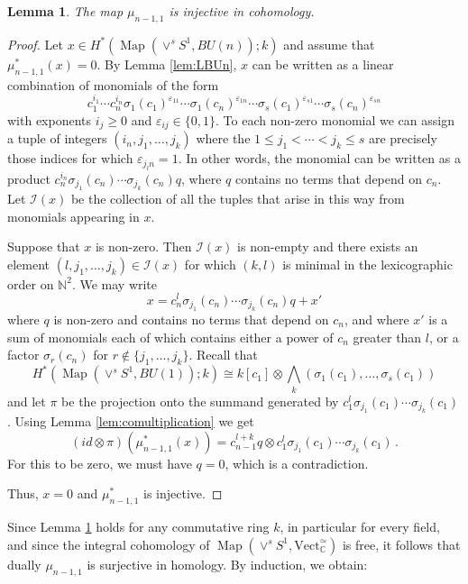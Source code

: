 \documentclass[oneside, a4paper, 12pt]{article}
\numberwithin{equation}{section}
\newcommand{\C}{\mathbb{C}}
\newcommand{\N}{\mathbb{N}}
\newcommand{\Vect}{\mathrm{Vect}}
\newcommand{\Map}{\operatorname{Map}}
\theoremstyle{plain}
\newtheorem{lemma}[theorem]{Lemma}
\theoremstyle{definition}
\theoremstyle{remark}
\begin{document}
\begin{lemma} \label{lem:injectivecohomology}
The map $\mu_{n-1,1}$ is injective in cohomology.
\end{lemma}
\begin{proof}
Let $x\in H^\ast(\Map(\vee^s S^1,BU(n));k)$ and assume that $\mu_{n-1,1}^\ast(x)=0$. By Lemma \ref{lem:LBUn}, $x$ can be written as a linear combination of monomials of the form
\[
c_1^{i_1}\cdots c_n^{i_n} \sigma_1(c_1)^{\varepsilon_{11}}\cdots \sigma_1(c_n)^{\varepsilon_{1n}} \cdots \sigma_s(c_1)^{\varepsilon_{s1}}\cdots \sigma_s(c_n)^{\varepsilon_{sn}}
\]
with exponents $i_j\geq 0$ and $\varepsilon_{ij}\in \{0,1\}$. To each non-zero monomial we can assign a tuple of integers $(i_n,j_1,\dots,j_k)$ where the $1\leq j_1 < \cdots < j_k \leq s$ are precisely those indices for which $\varepsilon_{j_l n}=1$.  In other words, the monomial can be written as a product $c_n^{i_n} \sigma_{j_1}(c_n)\cdots \sigma_{j_k}(c_n) q$, where $q$ contains no terms that depend on $c_n$. Let $\mathcal{I}(x)$ be the collection of all the tuples that arise in this way from monomials appearing in $x$.

Suppose that $x$ is non-zero. Then $\mathcal{I}(x)$ is non-empty and there exists an element $(l,j_1,\dots,j_k)\in \mathcal{I}(x)$ for which $(k,l)$ is minimal in the lexicographic order on $\N^2$. We may write
\[
x=c_n^l  \sigma_{j_1}(c_n)\cdots \sigma_{j_k}(c_n) q+ x'
\]
where $q$ is non-zero and contains no terms that depend on $c_n$, and where $x'$ is a sum of monomials each of which contains either a power of $c_n$ greater than $l$, or a factor $\sigma_{r}(c_n)$ for $r\not\in \{j_1,\dots,j_k\}$. Recall that
\[
H^\ast(\Map(\vee^s S^1,BU(1));k)\cong k[c_1]\otimes {\textstyle \bigwedge_k}(\sigma_1(c_1),\dots,\sigma_s(c_1))
\]
and let $\pi$ be the projection onto the summand generated by $c_1^l \sigma_{j_1}(c_1)\cdots \sigma_{j_k}(c_1)$. Using Lemma \ref{lem:comultiplication} we get
\[
(id\otimes \pi)(\mu_{n-1,1}^\ast(x))=c_{n-1}^{l+k} q \otimes c_1^l \sigma_{j_1}(c_1)\cdots \sigma_{j_k}(c_1)\, .
\]
For this to be zero, we must have $q=0$, which is a contradiction.

Thus, $x=0$ and $\mu_{n-1,1}^\ast$ is injective.
\end{proof}

Since Lemma \ref{lem:injectivecohomology} holds for any commutative ring $k$, in particular for every field, and since the integral cohomology of $\Map(\vee^s S^1,\Vect_{\C}^{\simeq})$ is free, it follows that dually $\mu_{n-1,1}$ is surjective in homology. By induction, we obtain:
\end{document}
